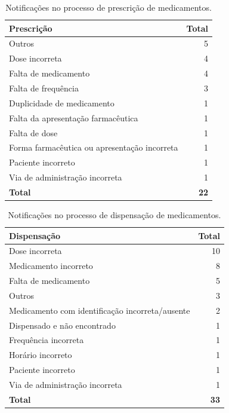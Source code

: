 \documentclass[
  a4paper]{article}
\begin{document}
\begin{table}[H]

\caption{\label{tab:unnamed-chunk-13}Notificações no processo de prescrição de medicamentos.}
\centering
\begin{tabular}[t]{lr}
\toprule
Prescrição & Total\\
\midrule
Outros & 5\\
Dose incorreta & 4\\
Falta de medicamento & 4\\
Falta de frequência & 3\\
Duplicidade de medicamento & 1\\
\addlinespace
Falta da apresentação farmacêutica & 1\\
Falta de dose & 1\\
Forma farmacêutica ou apresentação incorreta & 1\\
Paciente incorreto & 1\\
Via de administração incorreta & 1\\
\midrule
\addlinespace
\textbf{Total} & \textbf{22}\\
\bottomrule
\end{tabular}
\end{table}

\begin{table}[H]

\caption{\label{tab:unnamed-chunk-14}Notificações no processo de dispensação de medicamentos.}
\centering
\begin{tabular}[t]{lr}
\toprule
Dispensação & Total\\
\midrule
Dose incorreta & 10\\
Medicamento incorreto & 8\\
Falta de medicamento & 5\\
Outros & 3\\
Medicamento com identificação incorreta/ausente & 2\\
\addlinespace
Dispensado e não encontrado & 1\\
Frequência incorreta & 1\\
Horário incorreto & 1\\
Paciente incorreto & 1\\
Via de administração incorreta & 1\\
\midrule
\addlinespace
\textbf{Total} & \textbf{33}\\
\bottomrule
\end{tabular}
\end{table}
\end{document}
